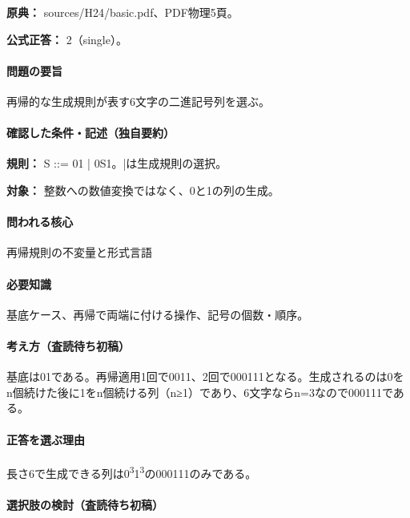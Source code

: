 \noindent\textbf{原典：} sources/H24/basic.pdf、PDF物理5頁。

\textbf{公式正答：} 2（single）。

\paragraph{問題の要旨} 再帰的な生成規則が表す6文字の二進記号列を選ぶ。

\paragraph{確認した条件・記述（独自要約）}\mbox{}\par

\noindent\textbf{規則：} S ::= 01 | 0S1。|は生成規則の選択。\par

\noindent\textbf{対象：} 整数への数値変換ではなく、0と1の列の生成。\par

\paragraph{問われる核心} 再帰規則の不変量と形式言語

\paragraph{必要知識} 基底ケース、再帰で両端に付ける操作、記号の個数・順序。

\paragraph{考え方（査読待ち初稿）} 基底は01である。再帰適用1回で0011、2回で000111となる。生成されるのは0をn個続けた後に1をn個続ける列（n≥1）であり、6文字ならn=\allowbreak{}3なので000111である。

\paragraph{正答を選ぶ理由} 長さ6で生成できる列は0\textsuperscript{3}1\textsuperscript{3}の000111のみである。

\paragraph{選択肢の検討（査読待ち初稿）}\mbox{}\par

